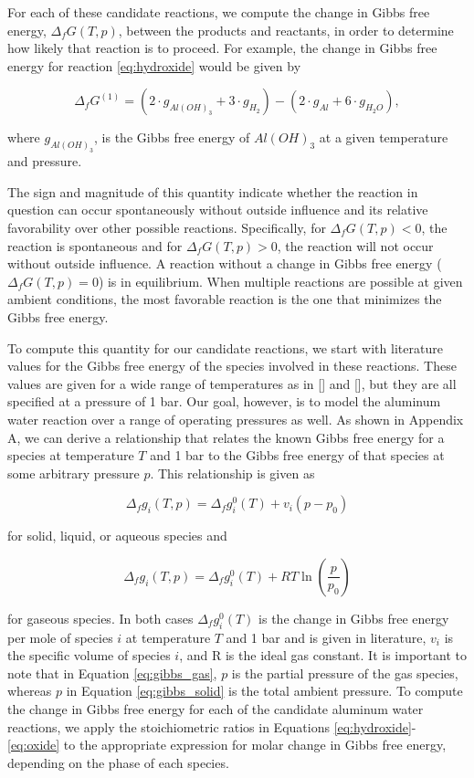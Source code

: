 \documentclass[preprint,12pt,3p]{elsarticle}
\begin{document}
For each of these candidate reactions, we compute the change in Gibbs free
energy, $\Delta_fG(T,p)$, between the products and reactants, in order to
determine how likely that reaction is to proceed. For example, the change in
Gibbs free energy for reaction \ref{eq:hydroxide} would be given by

\begin{equation}
  \Delta_fG^{(1)} = (2\cdot g_{Al(OH)_3} + 3\cdot g_{H_2}) - (2\cdot g_{Al} + 6\cdot g_{H_2O}),
\end{equation}

\noindent where $g_{Al(OH)_3}$, is the Gibbs free energy of $Al(OH)_3$ at a
given temperature and pressure.

The sign and magnitude of this quantity indicate whether the reaction in
question can occur spontaneously without outside influence and its relative
favorability over other possible reactions. Specifically, for $\Delta_fG(T,p) <
0$, the reaction is spontaneous and for $\Delta_fG(T,p) > 0$, the reaction will
not occur without outside influence. A reaction without a change in Gibbs free
energy ($\Delta_fG(T,p) = 0$) is in equilibrium. When multiple reactions are
possible at given ambient conditions, the most favorable reaction is the one
that minimizes the Gibbs free energy.

To compute this quantity for our candidate reactions, we start with literature
values for the Gibbs free energy of the species involved in these reactions.
These values are given for a wide range of temperatures as in [] and [], but
they are all specified at a pressure of 1 bar. Our goal, however, is to model
the aluminum water reaction over a range of operating pressures as well.  As
shown in Appendix A, we can derive a relationship that relates the known Gibbs
free energy for a species at temperature $T$ and 1 bar to the Gibbs free energy
of that species at some arbitrary pressure $p$. This relationship is given as

\begin{equation}
  \Delta_f g_i(T,p) = \Delta_f g_i^{0}(T) + v_i(p-p_0)
  \label{eq:gibbs_solid}
\end{equation}

\noindent for solid, liquid, or aqueous species and

\begin{equation}
  \Delta_f g_i(T,p) = \Delta_f g_i^{0}(T) + RT\ln\left(\frac{p}{p_0}\right) 
  \label{eq:gibbs_gas}
\end{equation}

\noindent for gaseous species. In both cases $\Delta_f g_i^0(T)$ is the change
in Gibbs free energy per mole of species $i$ at temperature $T$ and 1 bar and is
given in literature, $v_i$ is the specific volume of species $i$, and R is the
ideal gas constant. It is important to note that in Equation \ref{eq:gibbs_gas},
$p$ is the partial pressure of the gas species, whereas $p$ in Equation
\ref{eq:gibbs_solid} is the total ambient pressure. To compute the change in
Gibbs free energy for each of the candidate aluminum water reactions, we apply
the stoichiometric ratios in Equations \ref{eq:hydroxide}-\ref{eq:oxide} to the
appropriate expression for molar change in Gibbs free energy, depending on the
phase of each species.
\end{document}
